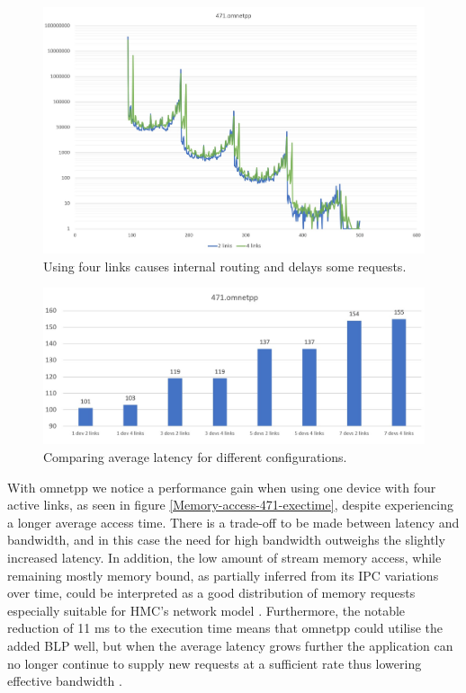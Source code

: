 \begin{figure}[!ht]
    \centering
    \includegraphics[width=1.0\linewidth]{figure/471-2_4-8.jpg}
    \caption{Using four links causes internal routing and delays some requests.}
    \label{Memory-access-471-link-compare}
\end{figure}

\begin{figure}[!ht]
    \centering
    \includegraphics[width=1.0\linewidth]{figure/471-averages.jpg}
    \caption{Comparing average latency for different configurations.}
    \label{Memory-access-471-averages}
\end{figure}

With omnetpp we notice a performance gain when using one device with four active links, as seen in figure \ref{Memory-access-471-exectime}, despite experiencing a longer average access time. There is a trade-off to be made between latency and bandwidth, and in this case the need for high bandwidth outweighs the slightly increased latency. In addition, the low amount of stream memory access, while remaining mostly memory bound, as partially inferred from its IPC variations over time, could be interpreted as a good distribution of memory requests especially suitable for HMC's network model \cite{song2018experiments}. Furthermore, the notable reduction of 11 ms to the execution time means that omnetpp could utilise the added BLP well, but when the average latency grows further the application can no longer continue to supply new requests at a sufficient rate thus lowering effective bandwidth \cite{10.1145/3167132.3167249}. 

